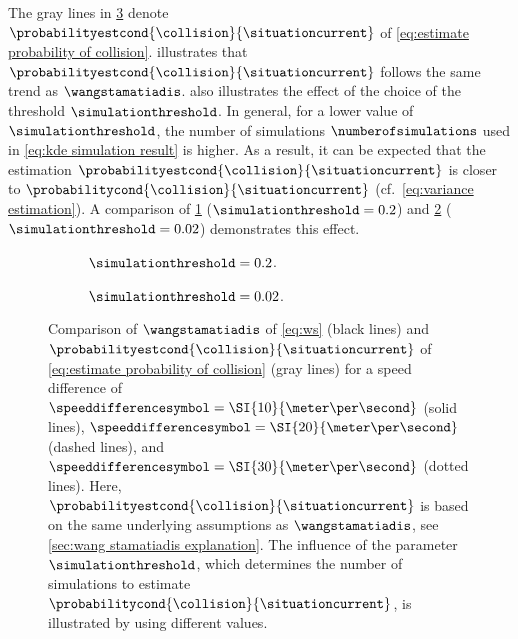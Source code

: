 The gray lines in \cref{fig:ws comparison} denote $\probabilityestcond{\collision}{\situationcurrent}$ of \cref{eq:estimate probability of collision}.
 illustrates that $\probabilityestcond{\collision}{\situationcurrent}$ follows the same trend as $\wangstamatiadis$.
 also illustrates the effect of the choice of the threshold $\simulationthreshold$.
In general, for a lower value of $\simulationthreshold$, the number of simulations $\numberofsimulations$ used in \cref{eq:kde simulation result} is higher. 
As a result, it can be expected that the estimation $\probabilityestcond{\collision}{\situationcurrent}$ is closer to $\probabilitycond{\collision}{\situationcurrent}$ \cstartb (cf.\ \cref{eq:variance estimation})\cendb.
A comparison of \cref{fig:ws comparison coarse} ($\simulationthreshold=0.2$) and \cref{fig:ws comparison fine} ($\simulationthreshold=0.02$) demonstrates this effect.

\setlength{\figurewidth}{.47\linewidth}
\setlength{\figureheight}{.7\figurewidth}
\begin{figure}
	\centering
	\begin{subfigure}{.49\linewidth}
		\centering
		
		\caption{$\simulationthreshold=0.2$.}
		\label{fig:ws comparison coarse}
	\end{subfigure}
	\begin{subfigure}{.49\linewidth}
		\centering
		
		\caption{$\simulationthreshold=0.02$.}
		\label{fig:ws comparison fine}
	\end{subfigure}
	\caption{Comparison of $\wangstamatiadis$ of \cref{eq:ws} (black lines) and $\probabilityestcond{\collision}{\situationcurrent}$ of \cref{eq:estimate probability of collision} (gray lines) for a speed difference of $\speeddifferencesymbol=\SI{10}{\meter\per\second}$ (solid lines), $\speeddifferencesymbol=\SI{20}{\meter\per\second}$ (dashed lines), and $\speeddifferencesymbol=\SI{30}{\meter\per\second}$ (dotted lines).
		Here, $\probabilityestcond{\collision}{\situationcurrent}$ is based on the same underlying assumptions as $\wangstamatiadis$, see \cref{sec:wang stamatiadis explanation}.
		The influence of the parameter $\simulationthreshold$, which determines the number of simulations to estimate $\probabilitycond{\collision}{\situationcurrent}$, is illustrated by using different values.}
	\label{fig:ws comparison}
\end{figure}



